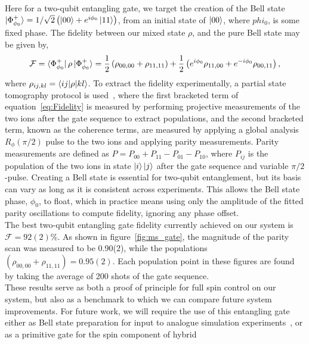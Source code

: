     Here for a two-qubit entangling gate, we target the creation of the Bell
    state $\ket{\Phi^+_{\phi_0}} = 1/\sqrt{2} \left( \ket{00} +
    e^{i\phi_0}\ket{11} \right)$, from an initial state of $\ket{00}$, where $phi_0$, is some fixed phase.
    The fidelity between our mixed state $\rho$, and the pure Bell state may be
    given by,
    \begin{equation}
        \mathcal{F} = \bra{\Phi^+_{\phi_0}} \rho \ket{\Phi^+_{\phi_0}} = \frac{1}{2} \left( \rho_{00,00} + \rho_{11,11} \right) + \frac{1}{2}\left( e^{i\phi_0}\rho_{11,00}+e^{-i\phi_0}\rho_{00,11}\right),
        \label{eq:Fidelity}
    \end{equation}
    where $\rho_{ij,kl} = \braket{ij|\rho|kl}$. To extract the fidelity experimentally, a partial state tomography 
    protocol is used~\cite{sackett2000experimental}, where the first bracketed term of
    equation~\ref{eq:Fidelity} is measured by performing projective measurements
    of the two ions after the gate sequence to extract populations, and the second bracketed term,
    known as the coherence terms, are measured by applying a global analysis
    $R_\phi(\pi/2)$ pulse to the two ions and applying parity measurements. 
    Parity measurements are defined as $P = P_{00} + P_{11} - P_{01} - P_{10}$, where $P_{ij}$ is the population of the two ions in state $\ket{i}\ket{j}$ after the gate sequence and variable $\pi/2$-pulse. 
    Creating a Bell state is essential for two-qubit entanglement, but its basis can vary as long as it is consistent across experiments. This allows the Bell state phase, $\phi_0$, to float, which in practice means using only the amplitude of the fitted parity oscillations to compute fidelity, ignoring any phase offset.\\
    The best two-qubit entangling gate fidelity currently achieved on our system is $\mathcal{F}=92(2)\%$. As shown in figure~\ref{fig:ms_gate}, the magnitude of the parity scan was measured to be 0.90(2), while the populations $\left( \rho_{00,00} + \rho_{11,11} \right) = 0.95(2)$. Each population point in these figures are found by taking the average of 200 shots of the gate sequence.\\
    These results serve as both a proof of principle for full spin control on
    our system, but also as a benchmark to which we can compare future system
    improvements.  For future work, we will require the use of this entangling
    gate either as Bell state preparation for input to analogue simulation
    experiments~\cite{bazavan2023synthetic}, or as a primitive gate for the spin component of hybrid
